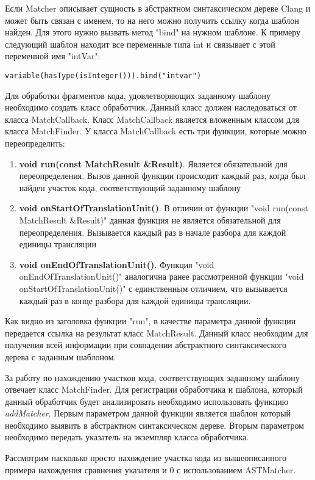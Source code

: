 Если Matcher описывает сущность в абстрактном синтаксическом дереве Clang и может быть 
связан с именем, то на него можно получить ссылку когда шаблон найден. Для этого нужно
вызвать метод "bind" на нужном шаблоне. К примеру следующий шаблон находит все переменные типа
int и связывает с этой переменной имя "intVar":
\begin{lstlisting}
variable(hasType(isInteger())).bind("intvar")
\end{lstlisting}

Для обработки фрагментов кода, удовлетворяющих заданному шаблону необходимо создать класс обработчик.
Данный класс должен наследоваться от класса MatchCallback. Класс MatchCallback является вложенным
классом для класса MatchFinder. У класса MatchCallback есть три функции, которые можно переопределить:
\begin{enumerate}
	\item \textbf{void run(const MatchResult \&Result)}. Является обязательной для переопределения.
Вызов данной функции происходит каждый раз, когда был найден участок кода, соответствующий
заданному шаблону
	\item \textbf{void onStartOfTranslationUnit()}. В отличии от функции "void run(const MatchResult \&Result)"
данная функция не является обязательной для переопределения. Вызывается каждый раз в начале
разбора для каждой единицы трансляции
	\item \textbf{void onEndOfTranslationUnit()}. Функция "void onEndOfTranslationUnit()"
аналогична ранее рассмотренной функции "void onStartOfTranslationUnit()" с единственным отличием,
что вызывается каждый раз в конце разбора для каждой единицы трансляции.
\end{enumerate}

Как видно из заголовка функции "run", в качестве параметра данной функции передается ссылка
на результат класс MatchResult. Данный класс необходим для получения всей информации при
совпадении абстрактного синтаксического дерева с заданным шаблоном. 

За работу по нахождению участков кода, соответствующих заданному шаблону отвечает класс
MatchFinder. Для регистрации обработчика и шаблона, который данный обработчик будет анализировать
необходимо использовать функцию \textit{addMatcher}. Первым параметром данной функции является 
шаблон который необходимо выявить в абстрактном синтаксическом дереве. Вторым параметром необходимо
передать указатель на экземпляр класса обработчика. 

Рассмотрим насколько просто нахождение участка кода из вышеописанного примера нахождения сравнения указателя
и 0 с использованием ASTMatcher.

